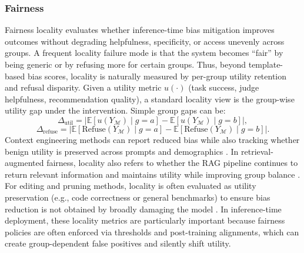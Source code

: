 \subsubsection{Fairness}
Fairness locality evaluates whether inference-time bias mitigation improves outcomes without degrading helpfulness, specificity, or access unevenly across groups. A frequent locality failure mode is that the system becomes “fair” by being generic or by refusing more for certain groups. Thus, beyond template-based bias scores, locality is naturally measured by per-group utility retention and refusal disparity. Given a utility metric $u(\cdot)$ (task success, judge helpfulness, recommendation quality), a standard locality view is the group-wise utility gap under the intervention. Simple group gaps can be:
\[
\Delta_{\mathrm{util}}
=
\left|\mathbb{E}[u(Y_{\mathcal{M}})\mid g{=}a]-\mathbb{E}[u(Y_{\mathcal{M}})\mid g{=}b]\right|,
\]
\[
\Delta_{\mathrm{refuse}}
=
\left|\mathbb{E}[\mathrm{Refuse}(Y_{\mathcal{M}})\mid g{=}a]-\mathbb{E}[\mathrm{Refuse}(Y_{\mathcal{M}})\mid g{=}b]\right|.
\]
Context engineering methods can report reduced bias while also tracking whether benign utility is preserved across prompts and demographics \citep{dwivedi2023breaking, huang2024bias, fayyazi2025facter, dhingra2023queer, kamruzzaman2024prompting}. In retrieval-augmented fairness, locality also refers to whether the RAG pipeline continues to return relevant information and maintains utility while improving group balance \citep{chen2024spica, shrestha2024fairrag}. For editing and pruning methods, locality is often evaluated as utility preservation (e.g., code correctness or general benchmarks) to ensure bias reduction is not obtained by broadly damaging the model \citep{cai2024locating, qin2024mitigating, zayed2024fairness, dasu2025attention, ma2025breaking}. In inference-time deployment, these locality metrics are particularly important because fairness policies are often enforced via thresholds and post-training alignments, which can create group-dependent false positives and silently shift utility.

